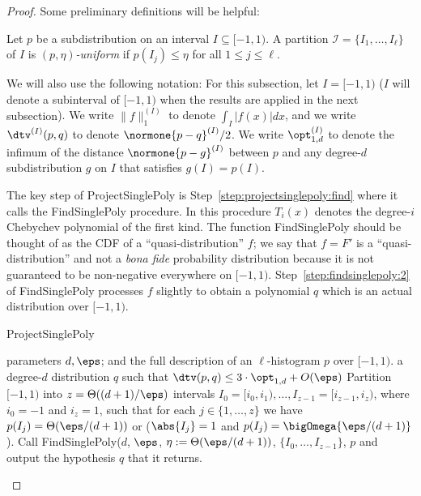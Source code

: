 \begin{proof}
\newcommand{\rr}{{r}} \newcommand{\pp}{{p}} Some preliminary definitions will be helpful:
\begin{definition}
  Let $p$ be a subdistribution on an interval $I \subseteq [-1,1)$.
  A partition $\mathcal{I} = \{I_1, \dots, I_\ell\}$ of $I$ is
  \emph{$(p,\eta)$-uniform} if $p(I_j) \leq \eta$ for all $1\leq j\leq \ell$.
\end{definition}

We will also use the following notation:  For this subsection, let $I = {[-1,1)}$ ({$I$ will denote a subinterval of $[-1,1)$ when the results
are applied in the next subsection}).
We write $\|f\|^{(I)}_{1}$ to denote $\int_{I} |f(x)| dx$,
and we write $\dtv^{(I)}(p,q)$ to denote $\normone{p-q}^{(I)}/2$.
We write $\opt^{(I)}_{1,d}$ to denote the {infimum of the} 
distance $\normone{p-g}^{(I)}$ between $p$ and any degree-$d$
subdistribution $g$ on $I$ that satisfies $g(I) = p(I)$.

The key step of {\sc ProjectSinglePoly} is 
Step~\ref{step:projectsinglepoly:find} where it calls the {\sc FindSinglePoly} procedure.
In this procedure
$T_i(x)$ denotes the degree-$i$ Chebychev polynomial
of the first kind.
The function {\sc FindSinglePoly} should be thought of
as the CDF of a ``quasi-distribution'' $f$; we say that
$f=F'$ is a ``quasi-distribution'' 
and not a \textit{bona fide} probability distribution because it is
not guaranteed to be non-negative everywhere on $[-1,1)$.  Step~\ref{step:findsinglepoly:2}
of {\sc FindSinglePoly} processes
$f$ slightly to obtain a polynomial $q$ which is an actual distribution over
$[-1,1).$
\begin{algorithm}
  \caption{{\sc ProjectSinglePoly}}
  \begin{algorithmic}[1]
    \Require parameters $d,\eps$; and the full description of an $\ell$-histogram $p$ over $[-1,1)$.
    \Ensure a degree-$d$ distribution $q$ such that $\dtv(p,q) \leq 3 \cdot \opt_{1,d} + O(\eps)$
    \State Partition $[-1,1)$ into $z = \Theta((d+1)/\eps)$ intervals $I_0 = [i_0,i_1), \dots, I_{z-1}=[i_{z-1},i_z)$, where $i_0=-1$ and $i_z=1$, such that
  for each $j \in \{1,\dots,z\}$ we have $p(I_j) = \Theta(\eps/(d+1))$ or ($\abs{I_j}=1$ and $p(I_j)=\bigOmega{\eps/(d+1)}$).
    \State\label{step:projectsinglepoly:find} Call {\sc FindSinglePoly}($d$, $\eps$, $\eta:=\Theta(\eps/(d+1))$, $\{I_0,\dots,I_{z-1}\}$, $p$ and output the hypothesis $q$ that it returns.
  \end{algorithmic}
\end{algorithm}



\end{proof}
